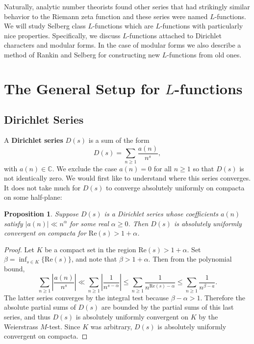 \documentclass[12pt]{book}
\newtheorem{proposition}{Proposition}[section]
\theoremstyle{definition}\newframedtheorem{method}{Method}
\newcommand{\C}{\mathbb{C}}
\renewcommand{\a}{\alpha}
\renewcommand{\b}{\beta}
\newcommand{\<}{\langle}
\renewcommand{\>}{\rangle}
\renewcommand{\Re}{\mathrm{Re}}
\begin{document}
  Naturally, analytic number theorists found other series that had strikingly similar behavior to the Riemann zeta function and these series were named $L$-functions. We will study Selberg class $L$-functions which are $L$-functions with particularly nice properties. Specifically, we discuss $L$-functions attached to Dirichlet characters and modular forms. In the case of modular forms we also describe a method of Rankin and Selberg for constructing new $L$-functions from old ones.
  \section{The General Setup for \texorpdfstring{$L$}{L}-functions}\label{sec:The_General_Setup_for_L-functions}
    \subsection*{Dirichlet Series}
      A \textbf{Dirichlet series} $D(s)$ is a sum of the form
      \[
        D(s) = \sum_{n \ge 1}\frac{a(n)}{n^{s}},
      \]
      with $a(n) \in \C$. We exclude the case $a(n) = 0$ for all $n \ge 1$ so that $D(s)$ is not identically zero. We would first like to understand where this series converges. It does not take much for $D(s)$ to converge absolutely uniformly on compacta on some half-plane:

      \begin{proposition}\label{prop:Dirichlet_series_holomorphic}
        Suppose $D(s)$ is a Dirichlet series whose coefficients $a(n)$ satisfy $|a(n)| \ll n^{\a}$ for some real $\a \ge 0$. Then $D(s)$ is absolutely uniformly convergent on compacta for $\Re(s) > 1+\a$.
      \end{proposition}
      \begin{proof}
        Let $K$ be a compact set in the region $\Re(s) > 1+\a$. Set $\b = \inf_{s \in K}\{\Re(s)\}$, and note that $\b > 1+\a$. Then from the polynomial bound,
        \[
          \sum_{n \ge 1}\left|\frac{a(n)}{n^{s}}\right| \ll \sum_{n \ge 1}\left|\frac{1}{n^{s-\a}}\right| \le \sum_{n \ge 1}\frac{1}{n^{\Re(s)-\a}} \le \sum_{n \ge 1}\frac{1}{n^{\b-a}}.
        \]
        The latter series converges by the integral test because $\b-\a > 1$. Therefore the absolute partial sums of $D(s)$ are bounded by the partial sums of this last series, and thus $D(s)$ is absolutely uniformly convergent on $K$ by the Weierstrass $M$-test. Since $K$ was arbitrary, $D(s)$ is absolutely uniformly convergent on compacta.
      \end{proof}
\end{document}
